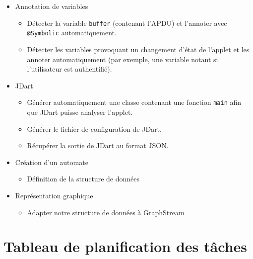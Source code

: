 \begin{itemize}
\item Annotation de variables
  \begin{itemize}
  \item Détecter la variable \verb|buffer| (contenant l'\gls{APDU}) et l'annoter avec \verb|@Symbolic| automatiquement.
  \item Détecter les variables provoquant un changement d'état de l'applet et les annoter automatiquement (par exemple, une variable notant si l'utilisateur est authentifié).
  \end{itemize}
\item JDart
  \begin{itemize}
  \item Générer automatiquement une classe contenant une fonction \verb|main| afin que JDart puisse analyser l'applet.
  \item Générer le fichier de configuration de JDart.
  \item Récupérer la sortie de JDart au format JSON.
  \end{itemize}
\item Création d'un automate
  \begin{itemize}
  \item Définition de la structure de données
  \end{itemize} 
\item Représentation graphique
  \begin{itemize}
  \item Adapter notre structure de données à GraphStream
  \end{itemize}
\end{itemize}

\section{Tableau de planification des tâches}

\shorthandoff{:!}

